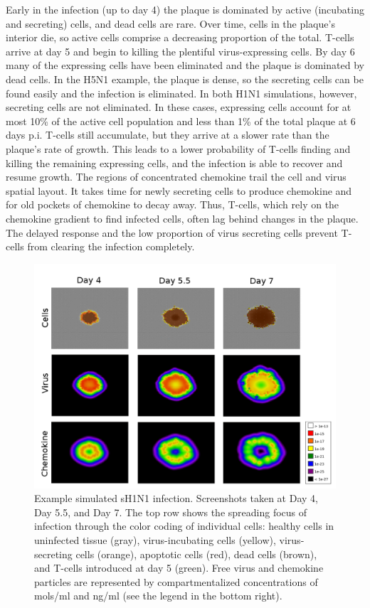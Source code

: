 \documentclass[10pt]{article}
\begin{document}
Early in the infection (up to day 4) the plaque is dominated by active (incubating and secreting) cells, and dead cells are rare. Over time, cells in the plaque's interior die, so active cells comprise a decreasing proportion of the total. T-cells arrive at day 5 and begin to killing the plentiful virus-expressing cells. By day 6 many of the expressing cells have been eliminated and the plaque is dominated by dead cells.  In the H5N1 example, the plaque is dense, so the secreting cells can be found easily and the infection is eliminated.  In both H1N1 simulations, however, secreting cells are not eliminated.  In these cases, expressing cells account for at most 10\% of the active cell population and less than  1\% of the total plaque at 6 days p.i.  T-cells still accumulate, but they arrive at a slower rate than the plaque's rate of growth. This leads to a lower probability of T-cells finding and killing the remaining expressing cells, and the infection is able to recover and resume growth.   The regions of concentrated chemokine trail the cell and virus spatial layout.  It takes time for newly secreting cells to produce chemokine and for old pockets of chemokine to decay away.  Thus, T-cells, which rely on the chemokine gradient to find infected cells, often lag behind changes in the plaque.  The delayed response and the low proportion of virus secreting cells prevent T-cells from clearing the infection completely.

\begin{figure}[ht!]
\begin{center}
 \includegraphics[width=\textwidth]{cycells}
 \end{center}
\caption{Example simulated sH1N1 infection. Screenshots taken at Day 4, Day 5.5, and Day 7.  The top row shows the spreading focus of infection  through the color coding of individual cells:  healthy cells in uninfected tissue (gray),  virus-incubating cells (yellow), virus-secreting cells (orange), apoptotic cells (red), dead cells (brown), and T-cells introduced at day 5 (green).  Free virus and chemokine particles are represented by compartmentalized concentrations of mols/ml and ng/ml (see the legend in the bottom right).} 
 \label{fig:cycells}
\end{figure}
\end{document}
